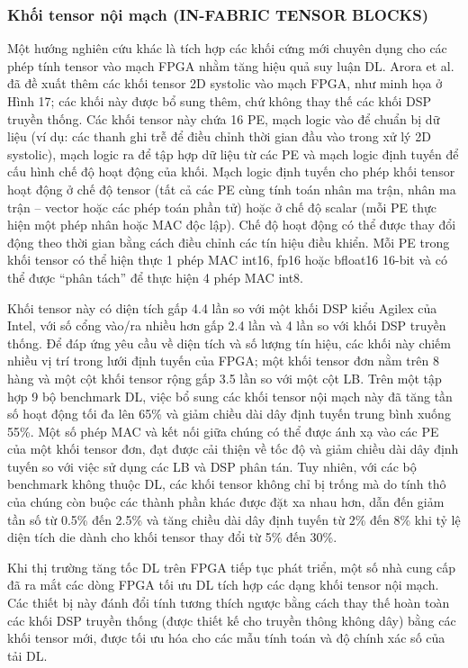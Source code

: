 \documentclass[a4paper]{article}
\begin{document}
\subsubsection{Khối tensor nội mạch (IN-FABRIC TENSOR BLOCKS)}
Một hướng nghiên cứu khác là tích hợp các khối cứng mới chuyên dụng cho các phép tính tensor vào mạch FPGA nhằm tăng hiệu quả suy luận DL. Arora et al.~\cite{112,113} đã đề xuất thêm các khối tensor 2D systolic vào mạch FPGA, như minh họa ở Hình 17; các khối này được bổ sung thêm, chứ không thay thế các khối DSP truyền thống. Các khối tensor này chứa 16 PE, mạch logic vào để chuẩn bị dữ liệu (ví dụ: các thanh ghi trễ để điều chỉnh thời gian đầu vào trong xử lý 2D systolic), mạch logic ra để tập hợp dữ liệu từ các PE và mạch logic định tuyến để cấu hình chế độ hoạt động của khối. Mạch logic định tuyến cho phép khối tensor hoạt động ở chế độ tensor (tất cả các PE cùng tính toán nhân ma trận, nhân ma trận – vector hoặc các phép toán phần tử) hoặc ở chế độ scalar (mỗi PE thực hiện một phép nhân hoặc MAC độc lập). Chế độ hoạt động có thể được thay đổi động theo thời gian bằng cách điều chỉnh các tín hiệu điều khiển. Mỗi PE trong khối tensor có thể hiện thực 1 phép MAC int16, fp16 hoặc bfloat16 16-bit và có thể được “phân tách” để thực hiện 4 phép MAC int8.

Khối tensor này có diện tích gấp 4.4 lần so với một khối DSP kiểu Agilex của Intel, với số cổng vào/ra nhiều hơn gấp 2.4 lần và 4 lần so với khối DSP truyền thống. Để đáp ứng yêu cầu về diện tích và số lượng tín hiệu, các khối này chiếm nhiều vị trí trong lưới định tuyến của FPGA; một khối tensor đơn nằm trên 8 hàng và một cột khối tensor rộng gấp 3.5 lần so với một cột LB. Trên một tập hợp 9 bộ benchmark DL, việc bổ sung các khối tensor nội mạch này đã tăng tần số hoạt động tối đa lên 65\% và giảm chiều dài dây định tuyến trung bình xuống 55\%. Một số phép MAC và kết nối giữa chúng có thể được ánh xạ vào các PE của một khối tensor đơn, đạt được cải thiện về tốc độ và giảm chiều dài dây định tuyến so với việc sử dụng các LB và DSP phân tán. Tuy nhiên, với các bộ benchmark không thuộc DL, các khối tensor không chỉ bị trống mà do tính thô của chúng còn buộc các thành phần khác được đặt xa nhau hơn, dẫn đến giảm tần số từ 0.5\% đến 2.5\% và tăng chiều dài dây định tuyến từ 2\% đến 8\% khi tỷ lệ diện tích die dành cho khối tensor thay đổi từ 5\% đến 30\%.

Khi thị trường tăng tốc DL trên FPGA tiếp tục phát triển, một số nhà cung cấp đã ra mắt các dòng FPGA tối ưu DL tích hợp các dạng khối tensor nội mạch. Các thiết bị này đánh đổi tính tương thích ngược bằng cách thay thế hoàn toàn các khối DSP truyền thống (được thiết kế cho truyền thông không dây) bằng các khối tensor mới, được tối ưu hóa cho các mẫu tính toán và độ chính xác số của tải DL.
\end{document}
